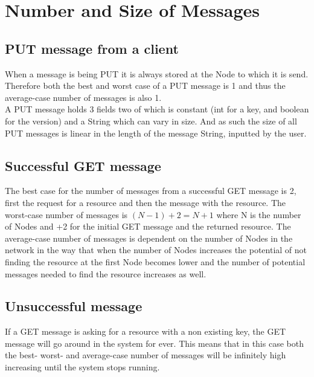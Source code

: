 \section{Number and Size of Messages}
\subsection{PUT message from a client}
When a message is being PUT it is always stored at the Node to which it is send. Therefore both the best and worst case of a PUT message is 1 and thus the average-case number of messages is also 1.\\
A PUT message holds 3 fields two of which is constant (int for a key, and boolean for the version) and a String which can vary in size.
And as such the size of all PUT messages is linear in the length of the message String, inputted by the user.

\subsection{Successful GET message}
The best case for the number of messages from a successful GET message is 2, first the request for a resource and then the message with the resource.
The worst-case number of messages is $(N-1)+2 = N+1$ where N is the number of Nodes and +2 for the initial GET message and the returned resource.
The average-case number of messages is dependent on the number of Nodes in the network in the way that when the number of Nodes increases the potential of not finding the resource at the first Node becomes lower and the number of potential messages needed to find the resource increases as well.

\subsection{Unsuccessful message}
If a GET message is asking for a resource with a non existing key, the GET message will go around in the system for ever. 
This means that in this case both the best- worst- and average-case number of messages will be infinitely high increasing until the system  stops running.